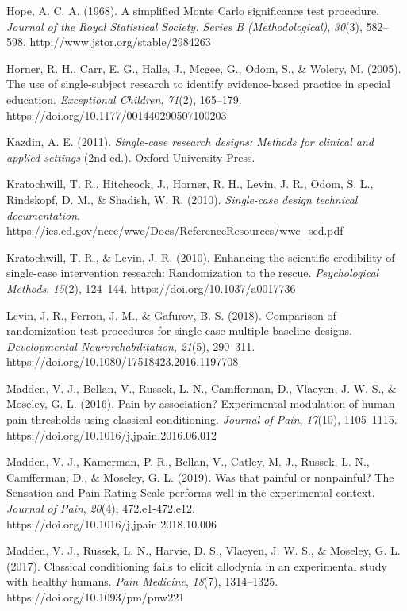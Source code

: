 \documentclass{article}
\begin{document}
Hope, A. C. A. (1968). A simplified Monte Carlo significance test procedure. \emph{Journal of the Royal Statistical Society. Series B (Methodological)}, \emph{30}(3), 582--598. http://www.jstor.org/stable/2984263

Horner, R. H., Carr, E. G., Halle, J., Mcgee, G., Odom, S., \& Wolery, M. (2005). The use of single-subject research to identify evidence-based practice in special education. \emph{Exceptional Children}, \emph{71}(2), 165--179. https://doi.org/10.1177/001440290507100203

Kazdin, A. E. (2011). \emph{Single-case research designs: Methods for clinical and applied settings} (2nd ed.). Oxford University Press.

Kratochwill, T. R., Hitchcock, J., Horner, R. H., Levin, J. R., Odom, S. L., Rindskopf, D. M., \& Shadish, W. R. (2010). \emph{Single-case design technical documentation}. https://ies.ed.gov/ncee/wwc/Docs/ReferenceResources/wwc\_scd.pdf

Kratochwill, T. R., \& Levin, J. R. (2010). Enhancing the scientific credibility of single-case intervention research: Randomization to the rescue. \emph{Psychological Methods}, \emph{15}(2), 124--144. https://doi.org/10.1037/a0017736

Levin, J. R., Ferron, J. M., \& Gafurov, B. S. (2018). Comparison of randomization-test procedures for single-case multiple-baseline designs. \emph{Developmental Neurorehabilitation}, \emph{21}(5), 290--311. https://doi.org/10.1080/17518423.2016.1197708

Madden, V. J., Bellan, V., Russek, L. N., Camfferman, D., Vlaeyen, J. W. S., \& Moseley, G. L. (2016). Pain by association? Experimental modulation of human pain thresholds using classical conditioning. \emph{Journal of Pain}, \emph{17}(10), 1105--1115. https://doi.org/10.1016/j.jpain.2016.06.012

Madden, V. J., Kamerman, P. R., Bellan, V., Catley, M. J., Russek, L. N., Camfferman, D., \& Moseley, G. L. (2019). Was that painful or nonpainful? The Sensation and Pain Rating Scale performs well in the experimental context. \emph{Journal of Pain}, \emph{20}(4), 472.e1-472.e12. https://doi.org/10.1016/j.jpain.2018.10.006

Madden, V. J., Russek, L. N., Harvie, D. S., Vlaeyen, J. W. S., \& Moseley, G. L. (2017). Classical conditioning fails to elicit allodynia in an experimental study with healthy humans. \emph{Pain Medicine}, \emph{18}(7), 1314--1325. https://doi.org/10.1093/pm/pnw221
\end{document}
